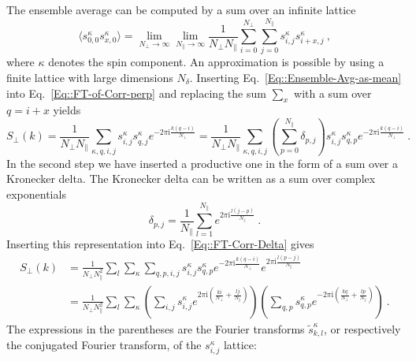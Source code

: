 	The ensemble average can be computed by a sum over an infinite lattice
	\begin{equation} \label{Eq::Ensemble-Avg-as-mean}
		\langle s^\kappa_{0,0} s_{x, 0}^\kappa \rangle =	\lim\limits_{N_\perp \rightarrow \infty} \lim\limits_{N_\parallel \rightarrow \infty} \frac{1}{N_\perp N_\parallel} \sum_{i =	0}^{N_\perp} \sum_{j=0}^{N_\parallel}   s^\kappa_{i,j} s_{i + x, j}^\kappa~,
	\end{equation}
	where $\kappa$ denotes the spin component. An approximation is possible by using a finite lattice with large dimensions $N_\delta$. Inserting Eq.~\eqref{Eq::Ensemble-Avg-as-mean} into Eq.~\eqref{Eq::FT-of-Corr-perp} and replacing the sum $\sum_x$ with a sum over $q =	i +x$ yields
	\begin{equation} \label{Eq::FT-Corr-Delta}
		S_\perp(k) = \frac{1}{N_\perp N_\parallel}  \sum_{\kappa,q,i,j}^{}   s^\kappa_{i,j} s_{q, j}^\kappa e^{-2\pi \mathrm{i} \frac{k(q-i)}{N_\perp}} =	\frac{1}{N_\perp N_\parallel}  \sum_{\kappa,q,i,j}^{}  \left(\sum_{p=0}^{N_\parallel} \delta_{p,j} \right) s^\kappa_{i,j} s_{q, p}^\kappa e^{-2\pi \mathrm{i} \frac{k(q-i)}{N_\perp}}~.
	\end{equation}
	In the second step we have inserted a productive one in the form of  a sum over a Kronecker delta. The Kronecker delta can be written as a sum over complex exponentials
	\begin{equation}
		\delta_{p,j} =	\frac{1}{N_\parallel} \sum_{l=1}^{N_\parallel} e^{2 \pi \mathrm{i} \frac{l(j - p)}{N_\parallel}}~.
	\end{equation}
	Inserting this representation into Eq.~\eqref{Eq::FT-Corr-Delta} gives
	\begin{equation}
		\begin{split}
			S_\perp(k) &=	\frac{1}{N_\perp N_\parallel^2} \sum_l \sum_\kappa \sum_{q,p,i,j} s^\kappa_{i,j} s_{q, p}^\kappa e^{-2\pi \mathrm{i} \frac{k(q-i)}{N_\perp}} e^{2 \pi \mathrm{i} \frac{l(p - j)}{N_\parallel}} \\
			&=	\frac{1}{N_\perp N_\parallel^2} \sum_l \sum_\kappa \left(\sum_{i,j} s^\kappa_{i,j} e^{2\pi \mathrm{i} \left(\frac{ki}{N_\perp} + \frac{lj}{N_\parallel} \right)} \right) \left(\sum_{q,p} s_{q, p}^\kappa e^{-2 \pi \mathrm{i} \left( \frac{kq}{N_\perp} + \frac{lp}{N_\parallel} \right)} \right)~.
		\end{split}
	\end{equation}
	The expressions in the parentheses are the Fourier transforms $\tilde{s}_{k,l}^\kappa$, or respectively the conjugated Fourier transform, of the $s_{i,j}^\kappa$ lattice:
